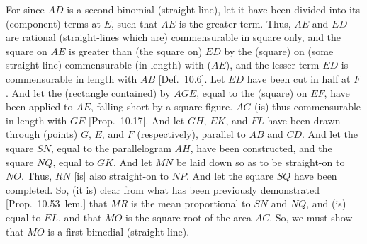 \begin{Parallel}{}{}
{For since $AD$ is a second binomial (straight-line), let it have been divided
into its (component) terms at $E$, such that $AE$ is the greater term. Thus,
$AE$ and $ED$ are rational (straight-lines which are) commensurable
in square only, and the square on $AE$ is greater than (the square on)
$ED$ by the (square) on (some straight-line) commensurable (in length) with ($AE$),
and the lesser term $ED$ is commensurable in length with $AB$ [Def.~10.6].  Let $ED$ have been cut in half at $F$.
And let the (rectangle contained) by $AGE$, equal to the (square) on $EF$,
 have been applied to $AE$, falling short by a square figure. $AG$
(is) thus commensurable in length with $GE$ [Prop.~10.17]. And let $GH$, $EK$, and
$FL$ have been drawn through (points) $G$, $E$, and $F$ (respectively), parallel
to $AB$ and $CD$. And let the square $SN$, equal to the parallelogram
$AH$, have been constructed, and the square $NQ$, equal to
$GK$.  And let $MN$ be laid down so as to be straight-on to $NO$. Thus,
$RN$ [is] also straight-on to $NP$. And let the square $SQ$ have been
completed. So, (it is) clear from what has been previously
demonstrated [Prop.~10.53~lem.] that
$MR$ is the mean proportional to $SN$ and $NQ$, and (is) equal to
$EL$, and that $MO$ is the square-root of the area $AC$. So, we
must show that $MO$ is a first bimedial (straight-line).

}
\end{Parallel}
